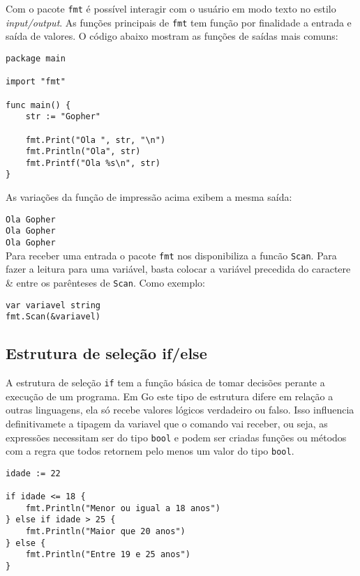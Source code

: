 \documentclass{SBCbookchapter}
\begin{document}
Com o pacote \texttt{fmt} é possível interagir com o usuário em modo texto no estilo \textit{input/output}. As funções principais de \texttt{fmt} tem função por finalidade a entrada e saída de valores. O código abaixo mostram as funções de saídas mais comuns:

\begin{lstlisting}
package main

import "fmt"

func main() {
	str := "Gopher"
	
	fmt.Print("Ola ", str, "\n")
	fmt.Println("Ola", str)
	fmt.Printf("Ola %s\n", str)
}
\end{lstlisting}

As variações da função de impressão acima exibem a mesma saída:

\noindent\texttt{Ola Gopher}\\
\texttt{Ola Gopher}\\
\texttt{Ola Gopher}\\

Para receber uma entrada o pacote \texttt{fmt} nos disponibiliza a funcão \texttt{Scan}. Para fazer a leitura para uma variável, basta colocar a variável precedida do caractere \& entre os parênteses de \texttt{Scan}. Como exemplo:

\begin{lstlisting}
var variavel string
fmt.Scan(&variavel)
\end{lstlisting}


\subsection{Estrutura de seleção if/else}

A estrutura de seleção \texttt{if} tem a função básica de tomar decisões perante a execução de um programa. Em Go este tipo de estrutura difere em relação a outras linguagens, ela só recebe valores lógicos verdadeiro ou falso. Isso influencia definitivamete a tipagem da variavel que o comando vai receber, ou seja, as expressões necessitam ser do tipo \texttt{bool} e podem ser criadas funções ou métodos com a regra que todos retornem pelo menos um valor do tipo \texttt{bool}.

\begin{lstlisting}
idade := 22

if idade <= 18 {
	fmt.Println("Menor ou igual a 18 anos")
} else if idade > 25 {
	fmt.Println("Maior que 20 anos")
} else {
	fmt.Println("Entre 19 e 25 anos")
}
\end{lstlisting}
\end{document}
